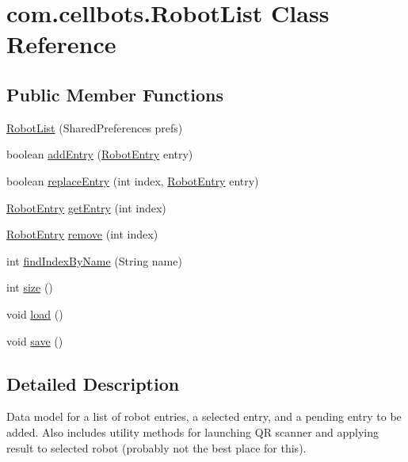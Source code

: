 \hypertarget{classcom_1_1cellbots_1_1_robot_list}{\section{com.\-cellbots.\-Robot\-List Class Reference}
\label{classcom_1_1cellbots_1_1_robot_list}
}
\subsection*{Public Member Functions}
\begin{DoxyCompactItemize}
\item 
\hyperlink{classcom_1_1cellbots_1_1_robot_list_aee080eedc3939cb26652d41bbcf229e5}{Robot\-List} (Shared\-Preferences prefs)
\item 
boolean \hyperlink{classcom_1_1cellbots_1_1_robot_list_a8a8c5b8ea27122769fbe3bcb69daf373}{add\-Entry} (\hyperlink{classcom_1_1cellbots_1_1_robot_entry}{Robot\-Entry} entry)
\item 
boolean \hyperlink{classcom_1_1cellbots_1_1_robot_list_ab48f1874b746b6d598e6c1a811fee6ee}{replace\-Entry} (int index, \hyperlink{classcom_1_1cellbots_1_1_robot_entry}{Robot\-Entry} entry)
\item 
\hyperlink{classcom_1_1cellbots_1_1_robot_entry}{Robot\-Entry} \hyperlink{classcom_1_1cellbots_1_1_robot_list_a9e418afce5a1cfbac4c2f4adf208814e}{get\-Entry} (int index)
\item 
\hyperlink{classcom_1_1cellbots_1_1_robot_entry}{Robot\-Entry} \hyperlink{classcom_1_1cellbots_1_1_robot_list_a3291b77dd4d0a88a691af38b3fcc112a}{remove} (int index)
\item 
int \hyperlink{classcom_1_1cellbots_1_1_robot_list_af4014b29124e131423545b0c73ec46ec}{find\-Index\-By\-Name} (String name)
\item 
int \hyperlink{classcom_1_1cellbots_1_1_robot_list_a55d48d7518537d39ee738a3420f7df84}{size} ()
\item 
void \hyperlink{classcom_1_1cellbots_1_1_robot_list_a366f580930417def6861553eddc4baa2}{load} ()
\item 
void \hyperlink{classcom_1_1cellbots_1_1_robot_list_a9ba2958404fbf876ffd05fdb6853d0aa}{save} ()
\end{DoxyCompactItemize}


\subsection{Detailed Description}
Data model for a list of robot entries, a selected entry, and a pending entry to be added. Also includes utility methods for launching Q\-R scanner and applying result to selected robot (probably not the best place for this).

